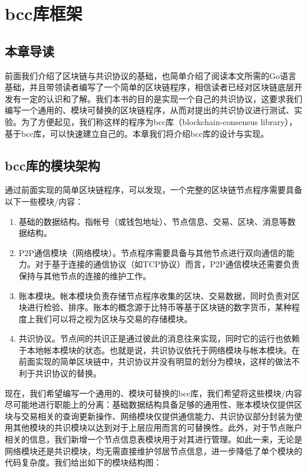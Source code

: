 \chapter{bcc库框架}

\section{本章导读}

前面我们介绍了区块链与共识协议的基础，也简单介绍了阅读本文所需的Go语言基础，并且带领读者编写了一个简单的区块链程序，相信读者已经对区块链底层开发有一定的认识和了解。我们本书的目的是实现一个自己的共识协议，这要求我们编写一个通用的、模块可替换的区块链程序，从而对提出的共识协议进行测试、实验。为了方便起见，我们称这样的程序为bcc库（blockchain-consensus library），基于bcc库，可以快速建立自己的。本章我们将介绍bcc库的设计与实现。

\section{bcc库的模块架构}

通过前面实现的简单区块链程序，可以发现，一个完整的区块链节点程序需要具备以下一些模块/内容：

\begin{enumerate}
    \item 基础的数据结构。指帐号（或钱包地址）、节点信息、交易、区块、消息等数据结构。
    \item P2P通信模块（网络模块）。节点程序需要具备与其他节点进行双向通信的能力。对于基于连接的通信协议（如TCP协议）而言，P2P通信模块还需要负责保持与其他节点的连接的维护工作。
    \item 账本模块。帐本模块负责存储节点程序收集的区块、交易数据，同时负责对区块进行检验、排序。账本的概念源于比特币等基于区块链的数字货币，某种程度上我们可以将之视为区块与交易的存储模块。
    \item 共识协议。节点间的共识正是通过彼此的消息往来实现，同时它的运行也依赖于本地帐本模块的状态。也就是说，共识协议依托于网络模块与帐本模块。在前面实现的简单区块链中，共识协议并没有明显的划分为模块，这样的做法不利于共识协议的替换。
\end{enumerate}

现在，我们希望编写一个通用的、模块可替换的bcc库，我们希望将这些模块/内容尽可能地进行职能上的分离：基础数据结构具备足够的通用性、账本模块仅提供区块与交易相关的查询更新操作、网络模块仅提供通信能力、共识协议部分封装为使用其他模块的共识模块以达到对于上层应用而言的可替换性。此外，对于节点账户相关的信息，我们新增一个节点信息表模块用于对其进行管理。如此一来，无论是网络模块还是共识模块，均无需直接维护邻居节点信息，进一步降低了单个模块的代码复杂度。我们给出如下的模块结构图：

